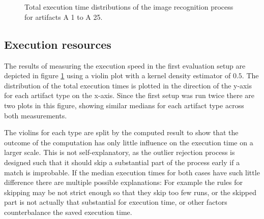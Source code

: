 \begin{figure}[h!]
	\hfill\\
	\hfill\\
	\caption{Total execution time distributions of the image recognition process for artifacts A 1 to A 25.}\label{fig:result-quantity-set1}
\end{figure}

\subsection{Execution resources}\label{sec:eval-results:subsec:res}

The results of measuring the execution speed in the first evaluation setup are depicted in figure \ref{fig:result-quantity-set1} using a violin plot with a kernel density estimator of $0.5$. The distribution of the total execution times is plotted in the direction of the y-axis for each artifact type on the x-axis. Since the first setup was run twice there are two plots in this figure, showing similar medians for each artifact type across both measurements.

The violins for each type are split by the computed result to show that the outcome of the computation has only little influence on the execution time on a larger scale. This is not self-explanatory, as the outlier rejection process is designed such that it should skip a substantial part of the process early if a match is improbable. If the median execution times for both cases have such little difference there are multiple possible explanations: For example the rules for skipping may be not strict enough so that they skip too few runs, or the skipped part is not actually that substantial for execution time, or other factors counterbalance the saved execution time.


